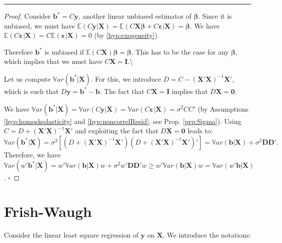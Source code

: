 \documentclass[
]{book}
\theoremstyle{definition}
\theoremstyle{definition}
\theoremstyle{definition}
\theoremstyle{definition}
\theoremstyle{remark}
\begin{document}
\begin{center}\rule{0.5\linewidth}{0.5pt}\end{center}

\begin{proof}
Consider \(\mathbf{b}^* = C \mathbf{y}\), another linear unbiased estimator of \(\boldsymbol\beta\). Since it is unbiased, we must have \(\mathbb{E}(C\mathbf{y}|\mathbf{X}) = \mathbb{E}(C\mathbf{X}\boldsymbol\beta + C\boldsymbol\varepsilon|\mathbf{X}) = \boldsymbol\beta\). We have \(\mathbb{E}(C\boldsymbol\varepsilon|\mathbf{X})=C\mathbb{E}(\boldsymbol\varepsilon|\mathbf{X})=0\) (by \ref{hyp:exogeneity}).

Therefore \(\mathbf{b}^*\) is unbiased if \(\mathbb{E}(C\mathbf{X})\boldsymbol\beta=\boldsymbol\beta\). This has to be the case for any \(\boldsymbol\beta\), which implies that we must have \(C\mathbf{X}=\mathbf{I}\).\textbackslash{}

Let us compute \(\mathbb{V}ar(\mathbf{b^*}|\mathbf{X})\). For this, we introduce \(D = C - (\mathbf{X}'\mathbf{X})^{-1}\mathbf{X}'\), which is such that \(D\mathbf{y}=\mathbf{b}^*-\mathbf{b}\). The fact that \(C\mathbf{X}=\mathbf{I}\) implies that \(D\mathbf{X} = \mathbf{0}\).

We have \(\mathbb{V}ar(\mathbf{b^*}|\mathbf{X}) = \mathbb{V}ar(C \mathbf{y}|\mathbf{X}) =\mathbb{V}ar(C \boldsymbol\varepsilon|\mathbf{X}) = \sigma^2CC'\) (by Assumptions \ref{hyp:homoskedasticity} and \ref{hyp:noncorrelResid}, see Prop. \ref{prp:Sigma}). Using \(C=D+(\mathbf{X}'\mathbf{X})^{-1}\mathbf{X}'\) and exploiting the fact that \(D\mathbf{X} = \mathbf{0}\) leads to:
\[
\mathbb{V}ar(\mathbf{b^*}|\mathbf{X}) =\sigma^2\left[(D+(\mathbf{X}'\mathbf{X})^{-1}\mathbf{X}')(D+(\mathbf{X}'\mathbf{X})^{-1}\mathbf{X}')'\right] = \mathbb{V}ar(\mathbf{b}|\mathbf{X}) + \sigma^2 \mathbf{D}\mathbf{D}'.
\]
Therefore, we have \(\mathbb{V}ar(w'\mathbf{b^*}|\mathbf{X})=w'\mathbb{V}ar(\mathbf{b}|\mathbf{X})w + \sigma^2 w'\mathbf{D}\mathbf{D}'w\ge w'\mathbb{V}ar(\mathbf{b}|\mathbf{X})w=\mathbb{V}ar(w'\mathbf{b}|\mathbf{X})\). \(\square\)
\end{proof}

\hypertarget{frish-waugh}{%
\section{Frish-Waugh}\label{frish-waugh}}

Consider the linear least square regression of \(\mathbf{y}\) on \(\mathbf{X}\). We introduce the notations:
\end{document}
